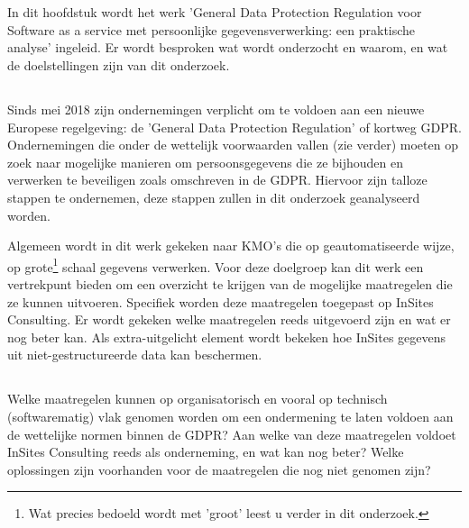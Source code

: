
\chapter{}
\label{ch:inleiding}

In dit hoofdstuk wordt het werk 'General Data Protection Regulation voor Software as a service met persoonlijke gegevensverwerking: een praktische analyse' ingeleid. Er wordt besproken wat wordt onderzocht en waarom, en wat de doelstellingen zijn van dit onderzoek.  
\section{}
\label{sec:probleemstelling}
Sinds mei 2018 zijn ondernemingen verplicht om te voldoen aan een nieuwe Europese regelgeving: de 'General Data Protection Regulation' of kortweg GDPR. 
Ondernemingen die onder de wettelijk voorwaarden vallen (zie verder) moeten op zoek naar mogelijke manieren om persoonsgegevens die ze bijhouden en verwerken te beveiligen zoals omschreven in de GDPR. Hiervoor zijn talloze stappen te ondernemen, deze stappen zullen in dit onderzoek geanalyseerd worden. 

Algemeen wordt in dit werk gekeken naar KMO's die op geautomatiseerde wijze, op grote\footnote{Wat precies bedoeld wordt met 'groot' leest u verder in dit onderzoek.} schaal gegevens verwerken. 
Voor deze doelgroep kan dit werk een vertrekpunt bieden om een overzicht te krijgen van de mogelijke maatregelen die ze kunnen uitvoeren. 
Specifiek worden deze maatregelen toegepast op InSites Consulting. Er wordt gekeken welke maatregelen reeds uitgevoerd zijn en wat er nog beter kan. 
Als extra-uitgelicht element wordt bekeken hoe InSites gegevens uit niet-gestructureerde data kan beschermen. 

\section{}
\label{sec:onderzoeksvraag}

Welke maatregelen kunnen op organisatorisch en vooral op technisch (softwarematig) vlak genomen worden om een ondermening te laten voldoen aan de wettelijke normen binnen de GDPR? Aan welke van deze maatregelen voldoet InSites Consulting reeds als onderneming, en wat kan nog beter? Welke oplossingen zijn voorhanden voor de maatregelen die nog niet genomen zijn?

